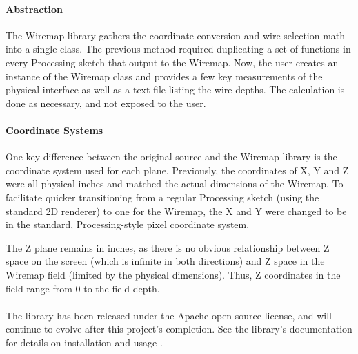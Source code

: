 \paragraph{Abstraction}
The Wiremap library gathers the coordinate conversion and wire selection math into a single class. The previous method required duplicating a set of functions in every Processing sketch that output to the Wiremap. Now, the user creates an instance of the Wiremap class and provides a few key measurements of the physical interface as well as a text file listing the wire depths. The calculation is done as necessary, and not exposed to the user.

\paragraph{Coordinate Systems}
One key difference between the original source and the Wiremap library is the coordinate system used for each plane. Previously, the coordinates of X, Y and Z were all physical inches and matched the actual dimensions of the Wiremap. To facilitate quicker transitioning from a regular Processing sketch (using the standard 2D renderer) to one for the Wiremap, the X and Y were changed to be in the standard, Processing-style pixel coordinate system.

The Z plane remains in inches, as there is no obvious relationship between Z space on the screen (which is infinite in both directions) and Z space in the Wiremap field (limited by the physical dimensions). Thus, Z coordinates in the field range from 0 to the field depth.

\paragraph{}The library has been released under the Apache open source license, and will continue to evolve after this project's completion. See the library's documentation for details on installation and usage \cite{CP}.
